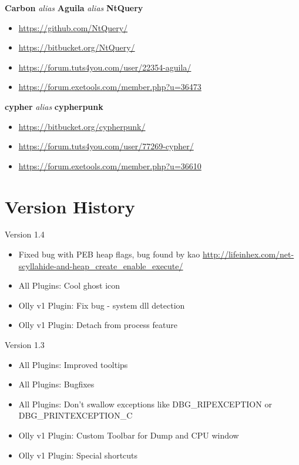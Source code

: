 \documentclass[10pt,a4paper]{article}
\begin{document}
\begin{center}
\textbf{Carbon} \textit{alias} \textbf{Aguila} \textit{alias} \textbf{NtQuery}
\begin{itemize}
\item \url{https://github.com/NtQuery/}
\item \url{https://bitbucket.org/NtQuery/}
\item \url{https://forum.tuts4you.com/user/22354-aguila/}
\item \url{https://forum.exetools.com/member.php?u=36473}
\end{itemize}


\textbf{cypher} \textit{alias} \textbf{cypherpunk}
\begin{itemize}
\item \url{https://bitbucket.org/cypherpunk/}
\item \url{https://forum.tuts4you.com/user/77269-cypher/}
\item \url{https://forum.exetools.com/member.php?u=36610}
\end{itemize}
\end{center}

\section{Version History}

Version 1.4
\begin{itemize}
\item Fixed bug with PEB heap flags, bug found by kao \url{http://lifeinhex.com/net-scyllahide-and-heap_create_enable_execute/}
\item All Plugins: Cool ghost icon
\item Olly v1 Plugin: Fix bug - system dll detection
\item Olly v1 Plugin: Detach from process feature
\end{itemize}

Version 1.3
\begin{itemize}
\item All Plugins: Improved tooltips
\item All Plugins: Bugfixes
\item All Plugins: Don't swallow exceptions like DBG\_RIPEXCEPTION or DBG\_PRINTEXCEPTION\_C
\item Olly v1 Plugin: Custom Toolbar for Dump and CPU window
\item Olly v1 Plugin: Special shortcuts
\end{itemize}
\end{document}
